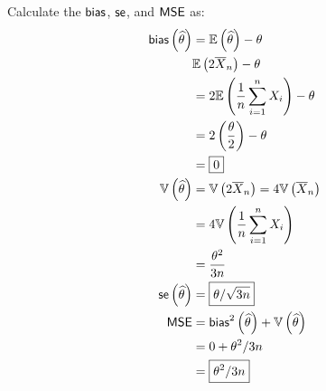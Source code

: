 \documentclass[a4paper]{article}
\begin{document}
Calculate the \(\operatorname{\textsf{bias}} \), \(\operatorname{\textsf{se}} \), and \(\operatorname{\textsf{MSE}} \) as:
\begin{align*}
	\operatorname{\textsf{bias}} \left( \widehat{\theta} \right)  & = \mathbb{E}\left( \widehat{\theta} \right) - \theta \\
	 & \mathbb{E}\left( 2 \overline{X}_{n} \right) - \theta \\ 
	 & = 2 \mathbb{E}\left( \frac{1}{n} \sum_{i=1}^{n} X_{i} \right) - \theta \\
	 & = 2 \left( \frac{\theta}{2} \right) - \theta \\
	 & = \boxed{0} \\
	\mathbb{V}\left( \widehat{\theta} \right) & = \mathbb{V}\left( 2 \overline{X}_{n} \right) = 4 \mathbb{V}\left( \overline{X}_{n} \right) \\
	 & = 4 \mathbb{V}\left( \frac{1}{n} \sum_{i=1}^{n} X_{i} \right) \\
	 & = \frac{\theta^{2}}{3n} \\
	\operatorname{\textsf{se}} \left( \widehat{\theta} \right) & = \boxed{\theta / \sqrt{3n}} \\
	\operatorname{\textsf{MSE}} & = \operatorname{\textsf{bias}}^{2} \left( \widehat{\theta} \right) + \mathbb{V}\left( \widehat{\theta} \right) \\
	 & = 0 + \theta^{2} / 3n \\
	 & = \boxed{\theta^{2} / 3n}
\end{align*}
\end{document}
